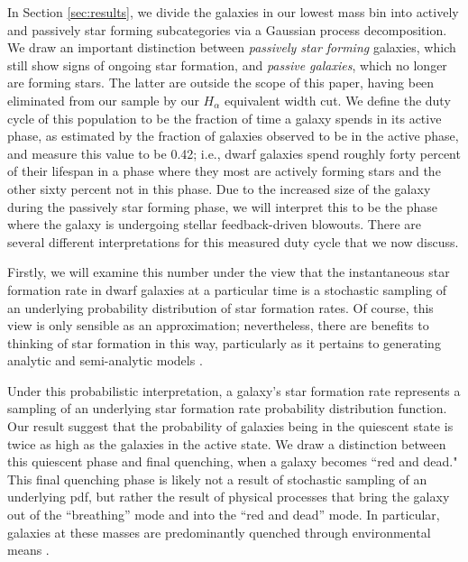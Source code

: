 \documentclass[iop]{emulateapj}
\begin{document}
In Section \ref{sec:results}, we divide the galaxies in our lowest mass bin into actively and passively star forming subcategories via a Gaussian process decomposition. We draw an important distinction between \textit{passively star forming} galaxies, which still show signs of ongoing star formation, and \textit{passive galaxies}, which no longer are forming stars. The latter are outside the scope of this paper, having been eliminated from our sample by our $H_{\alpha}$ equivalent width cut. We define the duty cycle of this population to be the fraction of time a galaxy spends in its active phase, as estimated by the fraction of galaxies observed to be in the active phase, and measure this value to be 0.42; i.e., dwarf galaxies spend roughly forty percent of their lifespan in a phase where they most are actively forming stars and the other sixty percent not in this phase. Due to the increased size of the galaxy during the passively star forming phase, we will interpret this to be the phase where the galaxy is undergoing stellar feedback-driven blowouts. There are several different interpretations for this measured duty cycle that we now discuss.

Firstly, we will examine this number under the view that the instantaneous star formation rate in dwarf galaxies at a particular time is a stochastic sampling of an underlying probability distribution of star formation rates. Of course, this view is only sensible as an approximation; nevertheless, there are benefits to thinking of star formation in this way, particularly as it pertains to generating analytic and semi-analytic models \citep{Kelson16}. 

Under this probabilistic interpretation, a galaxy's star formation rate represents a sampling of an underlying star formation rate probability distribution function. Our result suggest that the probability of galaxies being in the quiescent state is twice as high as the galaxies in the active state. We draw a distinction between this quiescent phase and final quenching, when a galaxy becomes ``red and dead." This final quenching phase is likely not a result of stochastic sampling of an underlying pdf, but rather the result of physical processes that bring the galaxy out of the ``breathing'' mode and into the ``red and dead'' mode. In particular, galaxies at these masses are predominantly quenched through environmental means \citep{Kauffmann03, geha12}.
\end{document}
